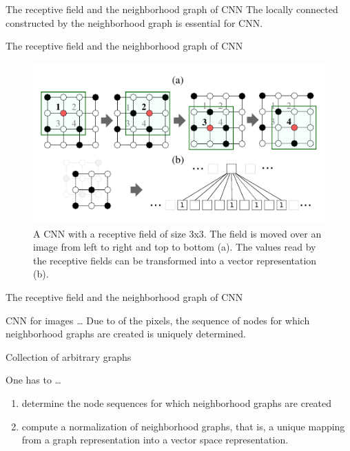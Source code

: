\documentclass[dvipdfmx]{beamer}
\begin{document}
  \begin{frame}{The receptive field and the neighborhood graph of CNN}
    The locally connected  constructed by the \alert{neighborhood graph} is essential for CNN.
  \end{frame}

  \begin{frame}{The receptive field and the neighborhood graph of CNN}
    \begin{figure}[h]
      \centering
      \includegraphics[width=0.8\paperwidth]{img/Fig1.pdf}
      \caption{A CNN with a receptive field of size 3x3.
        The field is moved over an image from left to right and top to bottom (a).
        The values read by the receptive fields can be transformed into a vector representation (b).}
    \end{figure}
  \end{frame}

  \begin{frame}{The receptive field and the neighborhood graph of CNN}
    \begin{block}{CNN for images \dots}
      Due to  of the pixels, the sequence of nodes
      for which neighborhood graphs are created is \alert{uniquely determined.}
    \end{block}
  \end{frame}

  \begin{frame}{Collection of \alert{arbitrary} graphs}
    \begin{block}{One has to \dots}
      \begin{enumerate}
        \item determine the node sequences for which neighborhood graphs are created
        \item compute a \alert{normalization} of neighborhood graphs, that is,
          a unique mapping from a graph representation into a vector space representation.
      \end{enumerate}
    \end{block}

    \vspace{1cm}
  \end{frame}
\end{document}
